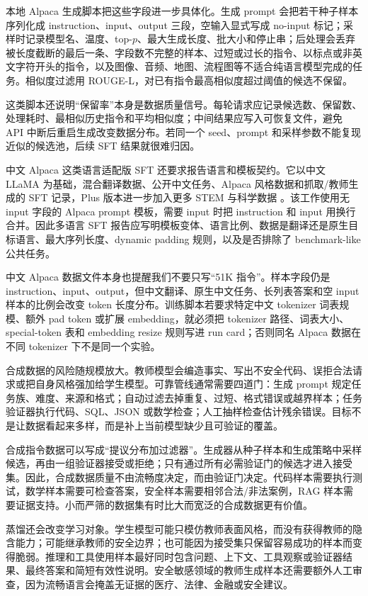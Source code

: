 \documentclass[UTF8,zihao=-4,openany]{ctexbook}
\begin{document}
本地 Alpaca 生成脚本把这些字段进一步具体化。生成 prompt 会把若干种子样本序列化成 instruction、input、output 三段，空输入显式写成 no-input 标记；采样时记录模型名、温度、top-$p$、最大生成长度、批大小和停止串；后处理会丢弃被长度截断的最后一条、字段数不完整的样本、过短或过长的指令、以标点或非英文字符开头的指令，以及图像、音频、地图、流程图等不适合纯语言模型完成的任务。相似度过滤用 ROUGE-L，对已有指令最高相似度超过阈值的候选不保留。

这类脚本还说明“保留率”本身是数据质量信号。每轮请求应记录候选数、保留数、处理耗时、最相似历史指令和平均相似度；中间结果应写入可恢复文件，避免 API 中断后重启生成改变数据分布。若同一个 seed、prompt 和采样参数不能复现近似的候选池，后续 SFT 结果就很难归因。

中文 Alpaca 这类语言适配版 SFT 还要求报告语言和模板契约。它以中文 LLaMA 为基础，混合翻译数据、公开中文任务、Alpaca 风格数据和抓取/教师生成的 SFT 记录，Plus 版本进一步加入更多 STEM 与科学数据 \cite{cui2023efficient}。该工作使用无 input 字段的 Alpaca prompt 模板，需要 input 时把 instruction 和 input 用换行合并。因此多语言 SFT 报告应写明模板变体、语言比例、数据是翻译还是原生目标语言、最大序列长度、dynamic padding 规则，以及是否排除了 benchmark-like 公共任务。

中文 Alpaca 数据文件本身也提醒我们不要只写“51K 指令”。样本字段仍是 instruction、input、output，但中文翻译、原生中文任务、长列表答案和空 input 样本的比例会改变 token 长度分布。训练脚本若要求特定中文 tokenizer 词表规模、额外 pad token 或扩展 embedding，就必须把 tokenizer 路径、词表大小、special-token 表和 embedding resize 规则写进 run card；否则同名 Alpaca 数据在不同 tokenizer 下不是同一个实验。

合成数据的风险随规模放大。教师模型会编造事实、写出不安全代码、误拒合法请求或把自身风格强加给学生模型。可靠管线通常需要四道门：生成 prompt 规定任务族、难度、来源和格式；自动过滤去掉重复、过短、格式错误或越界样本；任务验证器执行代码、SQL、JSON 或数学检查；人工抽样检查估计残余错误。目标不是让数据看起来多样，而是补上当前模型缺少且可验证的覆盖。

合成指令数据可以写成“提议分布加过滤器”。生成器从种子样本和生成策略中采样候选，再由一组验证器接受或拒绝；只有通过所有必需验证门的候选才进入接受集。因此，合成数据质量不由流畅度决定，而由验证门决定。代码样本需要执行测试，数学样本需要可检查答案，安全样本需要相邻合法/非法案例，RAG 样本需要证据支持。小而严筛的数据集有时比大而宽泛的合成数据更有价值。

蒸馏还会改变学习对象。学生模型可能只模仿教师表面风格，而没有获得教师的隐含能力；可能继承教师的安全边界；也可能因为接受集只保留容易成功的样本而变得脆弱。推理和工具使用样本最好同时包含问题、上下文、工具观察或验证器结果、最终答案和简短有效性说明。安全敏感领域的教师生成样本还需要额外人工审查，因为流畅语言会掩盖无证据的医疗、法律、金融或安全建议。
\end{document}
